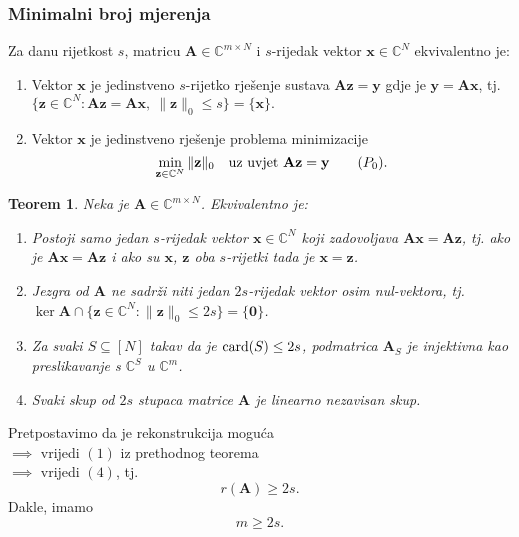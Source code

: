 \documentclass{beamer}
\newtheorem{thm}{Teorem}[section]
\newcommand{\C}{\mathbb{C}}
\newcommand{\vect}[1]{\mathbf{#1}}
\renewcommand{\vec}{\vect}
\newcommand{\card}{\text{\normalfont{card}}}
\newcommand{\norm}[1]{\|{#1}\|}
\begin{document}
\begin{frame}
    \frametitle{Minimalni broj mjerenja}
    Za danu rijetkost $s$, matricu $\vec A \in \C^{m \times N}$ i $s$-rijedak vektor $\vec x \in \C^N$ ekvivalentno je: \\
    \begin{enumerate}
            \bigskip
        \item Vektor $\vec{x}$ je jedinstveno $s$-rijetko rje\v{s}enje sustava $\vec{A}\vec{z}=\vec{y}$ gdje je $\vec{y} = \vec{Ax}$, tj. $\{\vec{z} \in \C^N : \vec{A}\vec{z}= \vec{A}\vec{x},\ \norm{\vec{z}}_0 \leq s\} = \{\vec{x}\}.$
            \bigskip
        \item Vektor $\vec{x}$ je jedinstveno rje\v{s}enje problema minimizacije
            \begin{equation}\label{problem_minimizacije}
                \min\limits_{\vec{z} \in \C^N} \norm{\vec{z}}_0\quad \text{uz uvjet}\ \vec{Az} = \vec y \tag{$P_{0}$}.
            \end{equation}
    \end{enumerate}
    
\end{frame}

\begin{frame}

\begin{thm} \label{rekonstrukcija_tm1}
    Neka je $\vec A \in \C^{m \times N}$. Ekvivalentno je:
    \begin{enumerate}
        \item Postoji samo jedan $s$-rijedak vektor $\vec x \in \C^N$ koji zadovoljava $\vec{Ax} = \vec{Az}$, tj. ako je $\vec{Ax}=\vec{Az}$ i ako su $\vec x$, $\vec z$ oba $s$-rijetki tada je $\vec x = \vec z$.
        \item Jezgra od $\vec A$ ne sadr\v{z}i niti jedan $2s$-rijedak vektor osim nul-vektora, tj. $\ker \vec A \cap \{\vec z \in \C^N: \norm{\vec z}_0 \leq 2s\} = \{\vec 0\}$.
        \item Za svaki $S \subseteq [N]$ takav da je $\card(S) \leq 2s$, podmatrica $\vec A_S$ je injektivna kao preslikavanje s $\C^S$ u $\C^m$.
        \item Svaki skup od $2s$ stupaca matrice $\vec A$ je linearno nezavisan skup.
    \end{enumerate}
\end{thm}
\end{frame}

\begin{frame}
        Pretpostavimo da je rekonstrukcija mogu\'ca \\
        \bigskip
        $\implies$ vrijedi $(1)$ iz prethodnog teorema\\ 
        $\implies$ vrijedi $(4)$, tj. 
        \bigskip
        \begin{equation*}
        r(\vec A) \geq 2s.
        \end{equation*}
        \bigskip
        Dakle, imamo
        \bigskip
        \begin{equation*}
        m \geq 2s.
        \end{equation*}
        \bigskip

\end{frame}
\end{document}
